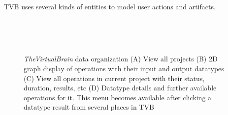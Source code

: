 \documentclass{bioinfo}
\newcommand{\TVB}{\textit{TheVirtualBrain }}
\begin{document}
		TVB uses several kinds of entities to model user actions
        and artifacts.

 \begin{figure}[!htbp]

		\centering
		\\
		\\
		\\
		\caption{\TVB data organization
		(A) View all projects
		(B) 2D graph display of operations with their input and output datatypes 
		(C) View all operations in current project with their status, duration, results, etc
		(D) Datatype details and further available operations for it. This menu becomes available after clicking a datatype result from several places in TVB }
				\label{fig:project}
\end{figure}
\end{document}
